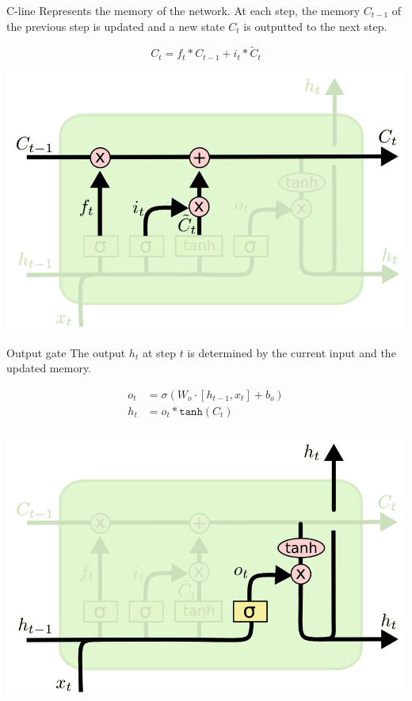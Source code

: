 \begin{descriptionlist}
    \item[C-line] 
        Represents the memory of the network.
        At each step, the memory $C_{t-1}$ of the previous step is updated and a new state $C_t$ is outputted to the next step.\\
        \begin{minipage}{0.6\linewidth}
            \[ C_t = f_t * C_{t-1} + i_t * \tilde{C}_t \]
        \end{minipage}
        \begin{minipage}{0.35\linewidth}
            \centering
            \includegraphics[width=0.85\linewidth]{./img/cline_update.png}
        \end{minipage}

    \item[Output gate] 
        The output $h_t$ at step $t$ is determined by the current input and the updated memory.\\
        \begin{minipage}{0.6\linewidth}
            \[
                \begin{split}
                    o_t &= \sigma( W_o \cdot [h_{t-1}, x_t] + b_o) \\
                    h_t &= o_t * \texttt{tanh}(C_t) \\
                \end{split}
            \]
        \end{minipage}
        \begin{minipage}{0.35\linewidth}
            \centering
            \includegraphics[width=0.85\linewidth]{./img/output_gate.png}
        \end{minipage}
\end{descriptionlist}